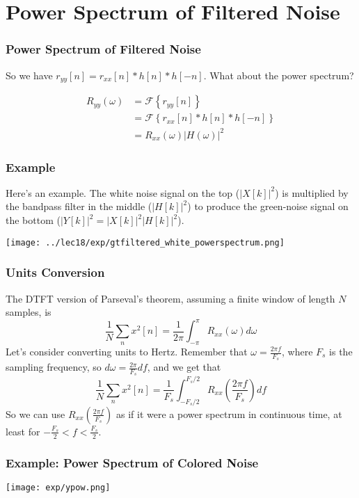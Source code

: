 \documentclass{beamer}
\begin{document}
\section[Spectrum]{Power Spectrum of Filtered Noise}
\setcounter{subsection}{1}

\begin{frame}
  \frametitle{Power Spectrum of Filtered Noise}

  So we have $r_{yy}[n]=r_{xx}[n]\ast h[n]\ast h[-n]$.  What about the
  power spectrum?

  \begin{align*}
    R_{yy}(\omega) &= {\mathcal F}\left\{r_{yy}[n]\right\} \\
    &= {\mathcal F}\left\{r_{xx}[n]\ast h[n]\ast h[-n]\right\} \\
    &= R_{xx}(\omega)|H(\omega)|^2
  \end{align*}
\end{frame}

\begin{frame}
  \frametitle{Example}

  Here's an example.  The white noise signal on the top ($|X[k]|^2$)
  is multiplied by the bandpass filter in the middle ($|H[k]|^2$) to
  produce the green-noise signal on the bottom
  ($|Y[k]|^2=|X[k]|^2|H[k]|^2$).
  
  \centerline{\texttt{[image: ../lec18/exp/gtfiltered\_white\_powerspectrum.png]}}
\end{frame}

\begin{frame}
  \frametitle{Units Conversion}

  The DTFT version of Parseval's theorem, assuming a finite window of
  length $N$ samples, is
  \[
  \frac{1}{N}\sum_{n} x^2[n] = \frac{1}{2\pi}\int_{-\pi}^{\pi} R_{xx}(\omega)d\omega
  \]
  Let's consider converting units to Hertz.  Remember that
  $\omega=\frac{2\pi f}{F_s}$, where $F_s$ is the sampling frequency, so
  $d\omega = \frac{2\pi}{F_s}df$, and we get that
  \[
  \frac{1}{N}\sum_{n} x^2[n] = \frac{1}{F_s}\int_{-F_s/2}^{F_s/2} R_{xx}\left(\frac{2\pi f}{F_s}\right)df
  \]
  So we can use $R_{xx}\left(\frac{2\pi f}{F_s}\right)$ as if it were
  a power spectrum in continuous time, at least for
  $-\frac{F_s}{2}<f<\frac{F_s}{2}$.
\end{frame}

\begin{frame}
  \frametitle{Example: Power Spectrum of Colored Noise}
  
  \centerline{\texttt{[image: exp/ypow.png]}}
\end{frame}
\end{document}
